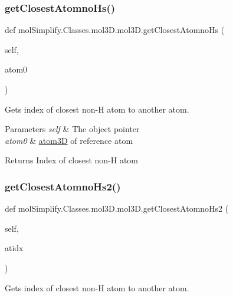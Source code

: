 \subsubsection{\texorpdfstring{get\+Closest\+Atomno\+Hs()}{getClosestAtomnoHs()}}
{\footnotesize\ttfamily def mol\+Simplify.\+Classes.\+mol3\+D.\+mol3\+D.\+get\+Closest\+Atomno\+Hs (\begin{DoxyParamCaption}\item[{}]{self,  }\item[{}]{atom0 }\end{DoxyParamCaption})}



Gets index of closest non-\/H atom to another atom. 


\begin{DoxyParams}{Parameters}
{\em self} & The object pointer \\
\hline
{\em atom0} & \hyperlink{namespacemolSimplify_1_1Classes_1_1atom3D}{atom3D} of reference atom \\
\hline
\end{DoxyParams}
\begin{DoxyReturn}{Returns}
Index of closest non-\/H atom 
\end{DoxyReturn}
\mbox{\label{classmolSimplify_1_1Classes_1_1mol3D_1_1mol3D_a911ffafa9384284b123be8c1670220ca}} 
\subsubsection{\texorpdfstring{get\+Closest\+Atomno\+Hs2()}{getClosestAtomnoHs2()}}
{\footnotesize\ttfamily def mol\+Simplify.\+Classes.\+mol3\+D.\+mol3\+D.\+get\+Closest\+Atomno\+Hs2 (\begin{DoxyParamCaption}\item[{}]{self,  }\item[{}]{atidx }\end{DoxyParamCaption})}



Gets index of closest non-\/H atom to another atom. 

